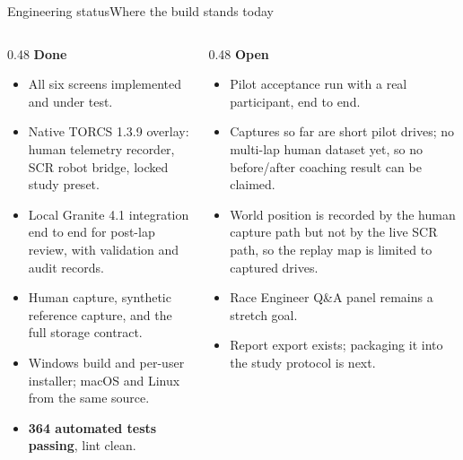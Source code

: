 \documentclass[aspectratio=169,10pt]{beamer}
\begin{document}
\begin{frame}{Engineering status}{Where the build stands today}
  \begin{columns}[T]
  \begin{column}{0.48\textwidth}\small
    \textbf{Done}
    \begin{itemize}\itemsep2pt
      \item All six screens implemented and under test.
      \item Native TORCS 1.3.9 overlay: human telemetry recorder, SCR robot
            bridge, locked study preset.
      \item Local Granite 4.1 integration end to end for post-lap review, with
            validation and audit records.
      \item Human capture, synthetic reference capture, and the full storage
            contract.
      \item Windows build and per-user installer; macOS and Linux from the same
            source.
      \item \textbf{364 automated tests passing}, lint clean.
    \end{itemize}
  \end{column}
  \begin{column}{0.48\textwidth}\small
    \textbf{Open}
    \begin{itemize}\itemsep2pt
      \item Pilot acceptance run with a real participant, end to end.
      \item Captures so far are short pilot drives; no multi-lap human dataset
            yet, so no before/after coaching result can be claimed.
      \item World position is recorded by the human capture path but not by the
            live SCR path, so the replay map is limited to captured drives.
      \item Race Engineer Q\&A panel remains a stretch goal.
      \item Report export exists; packaging it into the study protocol is next.
    \end{itemize}
  \end{column}
  \end{columns}
\end{frame}
\end{document}
